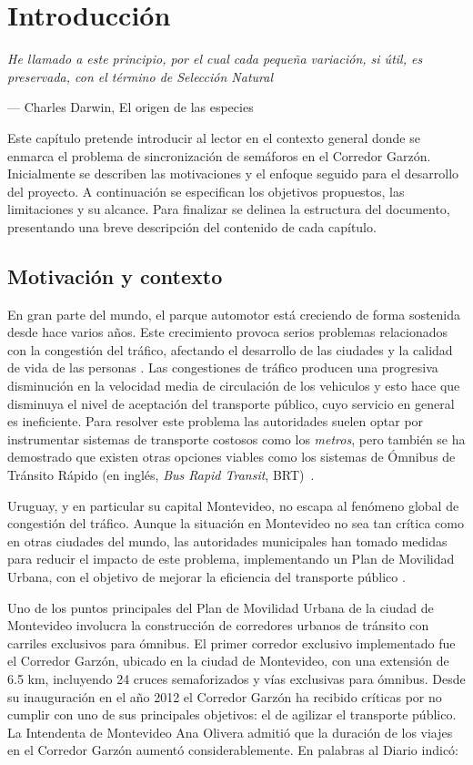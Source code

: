 \chapter{Introducción}
\epigraph{ \textit{He llamado a este principio, por el cual cada pequeña variación, si útil, es preservada, con el término de Selección Natural}}{--- Charles Darwin, El origen de las especies}

Este capítulo pretende introducir al lector en el contexto general donde se enmarca el problema de sincronización de semáforos en el Corredor Garzón. Inicialmente se describen las motivaciones y el enfoque seguido para el desarrollo del proyecto. A continuación se especifican los objetivos propuestos, las limitaciones y su alcance. Para finalizar se delinea la estructura del documento, presentando una breve descripción del contenido de cada capítulo. 

\section{Motivación y contexto}

En gran parte del mundo, el parque automotor está creciendo de forma sostenida desde hace varios años. Este crecimiento provoca serios problemas relacionados con la congestión del tráfico, afectando el desarrollo de las ciudades y la calidad de vida de las personas \citep{Cepal2003}. Las congestiones de tráfico producen una progresiva disminución en la velocidad media de circulación de los vehiculos y esto hace que disminuya el nivel de aceptación del transporte público, cuyo servicio en general es ineficiente. Para resolver este problema las autoridades suelen optar por instrumentar sistemas de transporte costosos como los \emph{metros}, pero también se ha demostrado que existen otras opciones viables como los sistemas de Ómnibus de Tránsito Rápido (en inglés, \textit{Bus Rapid Transit}, BRT)~\citep{BRT_Dial}.

Uruguay, y en particular su capital Montevideo, no escapa al fenómeno global de congestión del tráfico. Aunque la situación en Montevideo no sea tan crítica como en otras ciudades del mundo, las autoridades municipales han tomado medidas para reducir el impacto de este problema, implementando un Plan de Movilidad Urbana, con el objetivo de mejorar la eficiencia del transporte público \citep{PlanMovilidad}.

Uno de los puntos principales del Plan de Movilidad Urbana de la ciudad de Montevideo involucra la construcción de corredores urbanos de tránsito con carriles exclusivos para ómnibus. El primer corredor exclusivo implementado fue el Corredor Garzón, ubicado en la ciudad de Montevideo, con una extensión de 6.5 km, incluyendo 24 cruces semaforizados y vías exclusivas para ómnibus. Desde su inauguración en el año 2012 el Corredor Garzón ha recibido críticas por no cumplir con uno de sus principales objetivos: el de agilizar el transporte público. La Intendenta de Montevideo Ana Olivera admitió que la duración de los viajes en el Corredor Garzón aumentó considerablemente. En palabras al Diario \cite{olivera2015} indicó: 


